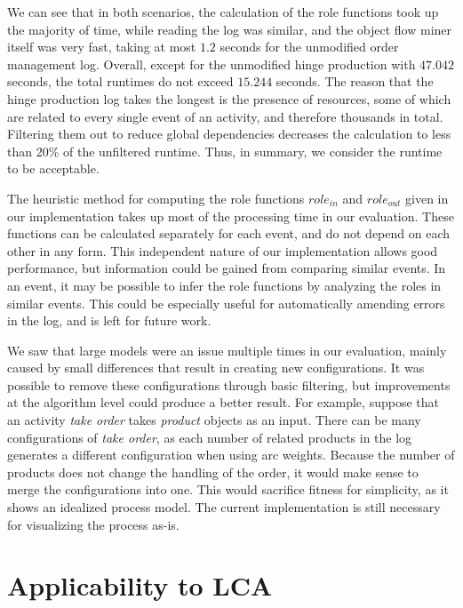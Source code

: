 We can see that in both scenarios, the calculation of the role functions took up the majority of time, while reading the log was similar, and the object flow miner itself was very fast, taking at most $1.2$ seconds for the unmodified order management log.
Overall, except for the unmodified hinge production with $47.042$ seconds, the total runtimes do not exceed $15.244$ seconds.
The reason that the hinge production log takes the longest is the presence of resources, some of which are related to every single event of an activity, and therefore thousands in total.
Filtering them out to reduce global dependencies decreases the calculation to less than 20\% of the unfiltered runtime.
Thus, in summary, we consider the runtime to be acceptable.



The heuristic method for computing the role functions $role_{in}$ and $role_{out}$ given in our implementation takes up most of the processing time in our evaluation.
These functions can be calculated separately for each event, and do not depend on each other in any form.
This independent nature of our implementation allows good performance, but information could be gained from comparing similar events.
In an event, it may be possible to infer the role functions by analyzing the roles in similar events.
This could be especially useful for automatically amending errors in the log, and is left for future work.



We saw that large models were an issue multiple times in our evaluation, mainly caused by small differences that result in creating new configurations.
It was possible to remove these configurations through basic filtering, but improvements at the algorithm level could produce a better result.
For example, suppose that an activity \emph{take order} takes \emph{product} objects as an input.
There can be many configurations of \emph{take order}, as each number of related products in the log generates a different configuration when using arc weights.
Because the number of products does not change the handling of the order, it would make sense to merge the configurations into one.
This would sacrifice fitness for simplicity, as it shows an idealized process model.
The current implementation is still necessary for visualizing the process as-is.



\section{Applicability to LCA}



